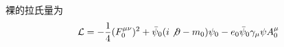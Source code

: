 

裸的拉氏量为
\begin{equation}
\begin{aligned}
\mathcal{L}=-\frac{1}{4}(F_0^{\mu\nu})^2+
\bar{\psi}_0 (i\not\partial -m_0)\psi_0 - e_0\bar\psi_0 \gamma_\mu\psi A_0^\mu
\end{aligned}
\end{equation}
